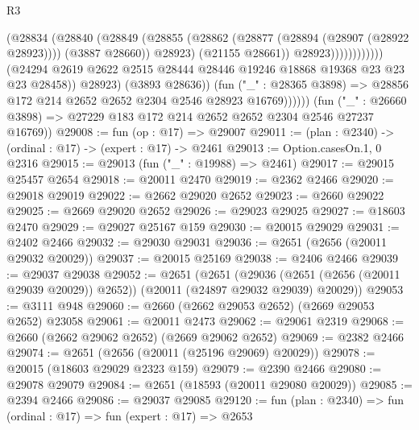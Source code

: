 \begin{lexlean}{R3}
\begin{coremodule}
                                          (@28834
                                            (@28840
                                              (@28849
                                                (@28855
                                                  (@28862
                                                    (@28877 (@28894 (@28907 (@28922 @28923))))
                                                    (@3887 @28660))
                                                  @28923)
                                                (@21155 @28661))
                                              @28923))))))))))))
                      (@24294
                        @2619
                        @2622
                        @2515
                        @28444
                        @28446
                        @19246
                        @18868
                        @19368
                        @23
                        @23
                        @23
                        @28458))
                    @28923)
                  (@3893 @28636))
                (fun ("_" : @28365 @3898) =>
                @28856 @172 @214 @2652 @2652 @2304 @2546 @28923 @16769))))))
      (fun ("_" : @26660 @3898) => @27229 @183 @172 @214 @2652 @2652 @2304 @2546 @27237 @16769))
@29008 := fun (op : @17) => @29007
@29011 := (plan : @2340) -> (ordinal : @17) -> (expert : @17) -> @2461
@29013 := Option.casesOn.{1, 0} @2316
@29015 := @29013 (fun ("_" : @19988) => @2461)
@29017 := @29015 @25457 @2654
@29018 := @20011 @2470
@29019 := @2362 @2466
@29020 := @29018 @29019
@29022 := @2662 @29020 @2652
@29023 := @2660 @29022
@29025 := @2669 @29020 @2652
@29026 := @29023 @29025
@29027 := @18603 @2470
@29029 := @29027 @25167 @159
@29030 := @20015 @29029
@29031 := @2402 @2466
@29032 := @29030 @29031
@29036 := @2651 (@2656 (@20011 @29032 @20029))
@29037 := @20015 @25169
@29038 := @2406 @2466
@29039 := @29037 @29038
@29052 := @2651
    (@2651
      (@29036 (@2651 (@2656 (@20011 @29039 @20029)) @2652))
      (@20011 (@24897 @29032 @29039) @20029))
@29053 := @3111 @948
@29060 := @2660 (@2662 @29053 @2652) (@2669 @29053 @2652) @23058
@29061 := @20011 @2473
@29062 := @29061 @2319
@29068 := @2660 (@2662 @29062 @2652) (@2669 @29062 @2652)
@29069 := @2382 @2466
@29074 := @2651 (@2656 (@20011 (@25196 @29069) @20029))
@29078 := @20015 (@18603 @29029 @2323 @159)
@29079 := @2390 @2466
@29080 := @29078 @29079
@29084 := @2651 (@18593 (@20011 @29080 @20029))
@29085 := @2394 @2466
@29086 := @29037 @29085
@29120 := fun (plan : @2340) =>
  fun (ordinal : @17) =>
  fun (expert : @17) =>
  @2653

\end{coremodule}
\end{lexlean}
